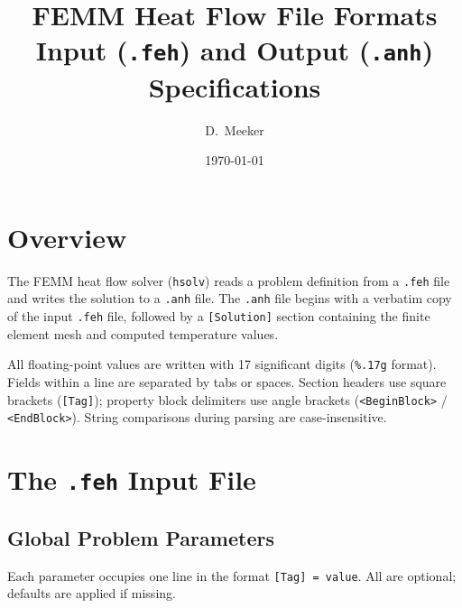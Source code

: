 \documentclass[11pt]{article}
\title{FEMM Heat Flow File Formats\\[0.5em]
\large Input (\texttt{.feh}) and Output (\texttt{.anh}) Specifications}
\author{D.\ Meeker}
\date{\today}
\begin{document}
\maketitle
\tableofcontents
\newpage

\section{Overview}

The FEMM heat flow solver (\texttt{hsolv}) reads a problem definition
from a \texttt{.feh} file and writes the solution to a \texttt{.anh}
file.  The \texttt{.anh} file begins with a verbatim copy of the input
\texttt{.feh} file, followed by a \texttt{[Solution]} section
containing the finite element mesh and computed temperature values.

All floating-point values are written with 17 significant digits
(\verb|%.17g| format).  Fields within a line are separated by tabs or
spaces.  Section headers use square brackets (\verb|[Tag]|); property
block delimiters use angle brackets (\verb|<BeginBlock>| /
\verb|<EndBlock>|).  String comparisons during parsing are
case-insensitive.

\section{The \texttt{.feh} Input File}

\subsection{Global Problem Parameters}

Each parameter occupies one line in the format
\verb|[Tag] = value|.  All are optional; defaults are applied if
missing.
\end{document}
